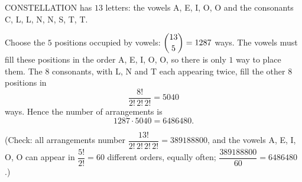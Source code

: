 CONSTELLATION has $13$ letters: the vowels A, E, I, O, O and the consonants C, L, L, N, N, S, T, T.

Choose the $5$ positions occupied by vowels: $\dbinom{13}{5}=1287$ ways. The vowels must fill these positions in the order A, E, I, O, O, so there is only $1$ way to place them. The $8$ consonants, with L, N and T each appearing twice, fill the other $8$ positions in
\[\dfrac{8!}{2!\,2!\,2!}=5040\]
ways. Hence the number of arrangements is
\[1287\cdot5040=\boxed{6486480}.\]

(Check: all arrangements number $\dfrac{13!}{2!\,2!\,2!\,2!}=389188800$, and the vowels A, E, I, O, O can appear in $\dfrac{5!}{2!}=60$ different orders, equally often; $\dfrac{389188800}{60}=6486480$.)
